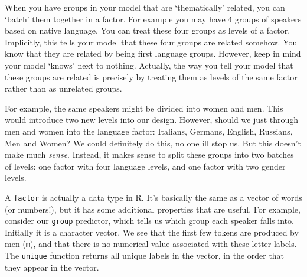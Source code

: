 \documentclass[
]{book}
\newenvironment{Shaded}{\begin{snugshade}}{\end{snugshade}}
\newcommand{\CommentTok}[1]{\textcolor[rgb]{0.56,0.35,0.01}{\textit{#1}}}
\newcommand{\DocumentationTok}[1]{\textcolor[rgb]{0.56,0.35,0.01}{\textbf{\textit{#1}}}}
\newcommand{\FunctionTok}[1]{\textcolor[rgb]{0.00,0.00,0.00}{#1}}
\newcommand{\NormalTok}[1]{#1}
\newcommand{\SpecialCharTok}[1]{\textcolor[rgb]{0.00,0.00,0.00}{#1}}
\begin{document}
When you have groups in your model that are `thematically' related, you can `batch' them together in a factor. For example you may have 4 groups of speakers based on native language. You can treat these four groups as levels of a factor. Implicitly, this tells your model that these four groups are related somehow. You know that they are related by being first language groups. However, keep in mind your model `knows' next to nothing. Actually, the way you tell your model that these groups are related is precisely by treating them as levels of the same factor rather than as unrelated groups.

For example, the same speakers might be divided into women and men. This would introduce two new levels into our design. However, should we just through men and women into the language factor: Italians, Germans, English, Russians, Men and Women? We could definitely do this, no one ill stop us. But this doesn't make much \emph{sense}. Instead, it makes sense to split these groups into two batches of levels: one factor with four language levels, and one factor with two gender levels.

A \texttt{factor} is actually a data type in R. It's basically the same as a vector of words (or numbers!), but it has some additional properties that are useful. For example, consider our \texttt{group} predictor, which tells us which group each speaker falls into. Initially it is a character vector. We see that the first few tokens are produced by men (\texttt{m}), and that there is no numerical value associated with these letter labels. The \texttt{unique} function returns all unique labels in the vector, in the order that they appear in the vector.

\begin{Shaded}
\end{Shaded}
\end{document}
